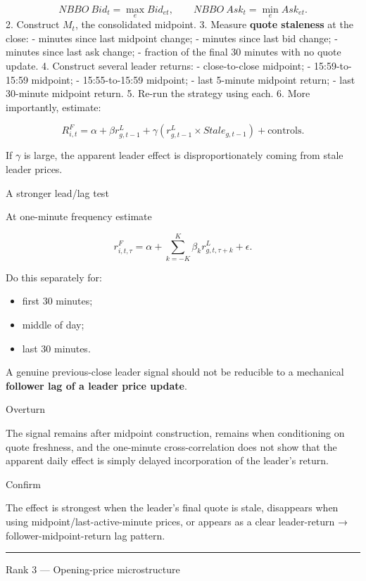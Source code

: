 \[
  NBBO\ Bid_t=\max_e Bid_{et},
     \qquad
     NBBO\ Ask_t=\min_e Ask_{et}.
  \]
2. Construct \(M_t\), the consolidated midpoint.
3. Measure \textbf{quote staleness} at the close:
- minutes since last midpoint change;
- minutes since last bid change;
- minutes since last ask change;
- fraction of the final 30 minutes with no quote update.
4. Construct several leader returns:
- close-to-close midpoint;
- 15:59-to-15:59 midpoint;
- 15:55-to-15:59 midpoint;
- last 5-minute midpoint return;
- last 30-minute midpoint return.
5. Re-run the strategy using each.
6. More importantly, estimate:

\[
R^{F}_{i,t}
=
\alpha+
\beta r^{L}_{g,t-1}
+
\gamma
\left(r^{L}_{g,t-1}\times Stale_{g,t-1}\right)
+\text{controls}.
\]

If \(\gamma\) is large, the apparent leader effect is disproportionately coming from stale leader prices.

A stronger lead/lag test

At one-minute frequency estimate

\[
r^F_{i,t,\tau}
=
\alpha+
\sum_{k=-K}^{K}\beta_k r^L_{g,t,\tau+k}
+\epsilon.
\]

Do this separately for:

\begin{itemize}
\tightlist
\item
  first 30 minutes;
\item
  middle of day;
\item
  last 30 minutes.
\end{itemize}

A genuine previous-close leader signal should not be reducible to a mechanical \textbf{follower lag of a leader price update}.

Overturn

The signal remains after midpoint construction, remains when conditioning on quote freshness, and the one-minute cross-correlation does not show that the apparent daily effect is simply delayed incorporation of the leader's return.

Confirm

The effect is strongest when the leader's final quote is stale, disappears when using midpoint/last-active-minute prices, or appears as a clear leader-return → follower-midpoint-return lag pattern.

\begin{center}\rule{0.5\linewidth}{0.5pt}\end{center}

Rank 3 --- Opening-price microstructure

